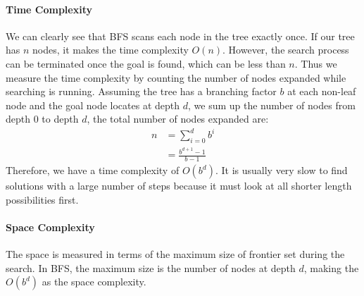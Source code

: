 \documentclass[main.tex]{subfiles}
\begin{document}
\paragraph{Time Complexity} We can clearly see that BFS scans each node in the tree exactly once. If our tree has $n$ nodes, it makes the time complexity $O(n)$. However, the search process can be terminated once the goal is found, which can be less than $n$. Thus we measure the time complexity by counting the number of nodes expanded while searching is running.  Assuming the tree has a branching factor $b$ at each non-leaf node and the goal node locates at depth $d$, we sum up the number of nodes from depth 0 to depth $d$, the total number of nodes expanded are:
\begin{align}
    n &= \sum_{i=0}^{d} b^{i} \\
    &= \frac{b^{d+1} -1}{b-1}
\end{align}
Therefore, we have a time complexity of $O(b^d)$. It is usually very slow to find solutions with a large number of steps because it must look at all shorter length possibilities first.%
\paragraph{Space Complexity}
The space is measured in terms of the maximum size of frontier set during the search. In BFS, the maximum size is the number of nodes at depth $d$, making the $O(b^d)$ as the space complexity.


\end{document}

